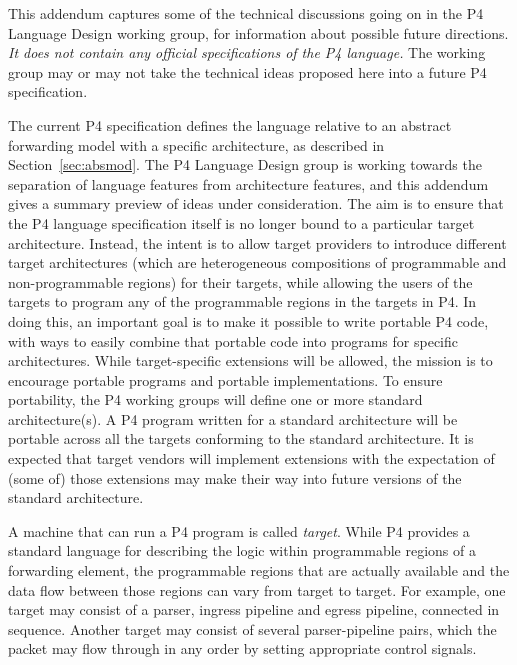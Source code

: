 
This addendum captures some of the technical discussions going on
in the P4 Language Design working group, for information about possible future
directions. \textit{It does not contain any
official specifications of the P4 language.} The working group may or may not
take the technical ideas proposed here into a future P4 specification.


The current P4 specification defines the language relative to an
abstract forwarding model with a specific architecture, as described
in Section~\ref{sec:absmod}.  The P4 Language Design group is working
towards the separation of language features from architecture features,
and this addendum gives a summary preview of ideas under consideration.
The aim is to ensure that the P4 language specification itself is no longer
bound to a particular target architecture.  Instead, the intent is to
allow target providers to introduce different target architectures
(which are heterogeneous compositions of programmable and non-programmable
regions) for their targets, while allowing the users of the targets to program
any of the programmable regions in the targets in P4.  In doing this, an
important goal is to make it possible to write portable P4 code, with ways to
easily combine that portable code into programs for specific architectures.
While target-specific extensions will be allowed, the mission is to encourage
portable programs and portable implementations.  To ensure portability,
the P4 working groups will define one or more standard architecture(s).
A P4 program written for a standard architecture will be portable across all
the targets conforming to the standard architecture.  It is expected that target
vendors will implement extensions with the expectation of (some of) those
extensions may make their way into future versions of the standard architecture.


A machine that can run a P4 program is called \textit{target}.
While P4 provides a standard language for describing the logic within
programmable regions of a forwarding element, the programmable regions that are
actually available and the data flow between those regions can vary
from target to target.  For example, one target may consist of a parser,
ingress \matchaction pipeline and egress \matchaction pipeline, connected in
sequence.  Another target may consist of several parser-pipeline pairs,
which the packet may flow through in any order by setting appropriate
control signals.

